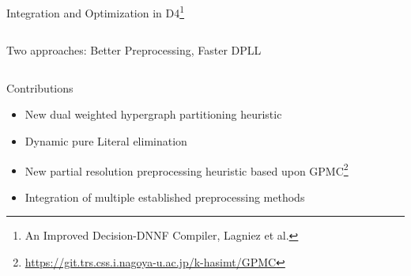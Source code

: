 \documentclass[
	aspectratio=169, %
	8pt, %
]{beamer}
\begin{document}
\begin{frame}{Integration and Optimization in D4\footnote{An Improved Decision-DNNF Compiler, Lagniez et al.}}
    \begin{columns}
        \begin{column}{.6\textwidth}
            Two approaches:  Better Preprocessing, Faster DPLL
        \end{column}
        \begin{column}{.4\textwidth}
        \end{column}
    \end{columns}
    \begin{block}{Contributions}
       
        \begin{itemize}
            \item New dual weighted hypergraph partitioning heuristic
            \item Dynamic pure Literal elimination
            \item New partial resolution preprocessing heuristic based upon GPMC\footnote{\href{https://git.trs.css.i.nagoya-u.ac.jp/k-hasimt/GPMC}{https://git.trs.css.i.nagoya-u.ac.jp/k-hasimt/GPMC}}
            \item Integration of multiple established preprocessing methods
        \end{itemize}
    \end{block}
\end{frame}
\end{document}
